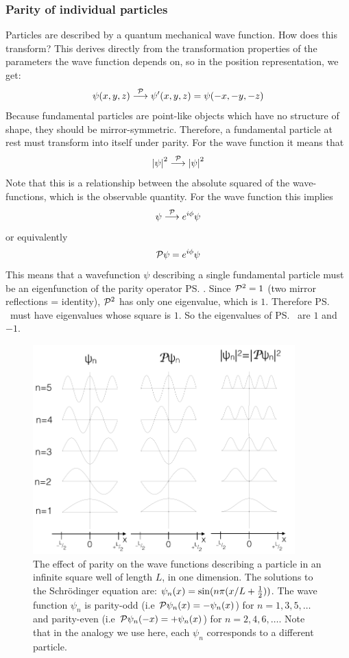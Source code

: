 \subsubsection{Parity of individual particles}
Particles are described by a quantum mechanical wave function. How does this transform? This derives directly from the transformation properties of the parameters the wave function depends on, so in the position representation, we get:
\begin{equation}
    \psi(x, y, z) \stackrel{\mathcal{P}}{\longrightarrow} \psi'(x, y, z) = \psi(-x, -y, -z)
\end{equation}
Because fundamental particles are point-like objects which have no structure of shape, they should be mirror-symmetric. Therefore, a fundamental particle at rest must transform into itself under parity.  For the wave function it means that
\begin{equation}
 \left|\psi \right|^2 \stackrel{\mathcal{P}}{\longrightarrow} \left|\psi\right|^2
\end{equation}
Note that this is a relationship between the absolute squared of the wave-functions, which is the observable quantity. For the wave function this implies
\begin{equation}
 \psi \stackrel{\mathcal{P}}{\longrightarrow} e^{i\phi} \psi
\end{equation}
 or equivalently
\begin{equation}
 \mathcal{P} \psi = e^{i\phi} \psi
\end{equation}
This means that a wavefunction $\psi$ describing a single fundamental particle must be an eigenfunction of the parity operator \ps. Since $\mathcal{P}^2=1$ (two mirror reflections = identity), $\mathcal{P}^2$ has only one eigenvalue, which is $1$. Therefore \ps\ must have eigenvalues whose square is $1$. So the eigenvalues of \ps\ are $1$ and $-1$.
\begin{figure}
\includegraphics[width=0.9\textwidth]{fig/Parity_1D_squareWell}
\caption{The effect of parity on the wave functions describing a particle in an infinite square well of length $L$, in one dimension. The solutions to the Schr\"odinger equation are: $\psi_n(x)=\sin(n \pi (x/L + \frac{1}{2}))$. The wave function $\psi_n$ is parity-odd (i.e $\mathcal{P} \psi_n(x) = -\psi_n(x)$) for $n = 1, 3, 5 , \ldots$ and parity-even (i.e $\mathcal{P} \psi_n(-x) = +\psi_n(x)$) for $n = 2, 4, 6, \ldots$. Note that in the analogy we use here, each $\psi_n$ corresponds to a different particle.
\label{fig:parity_1D_squareWell}}
\end{figure}
